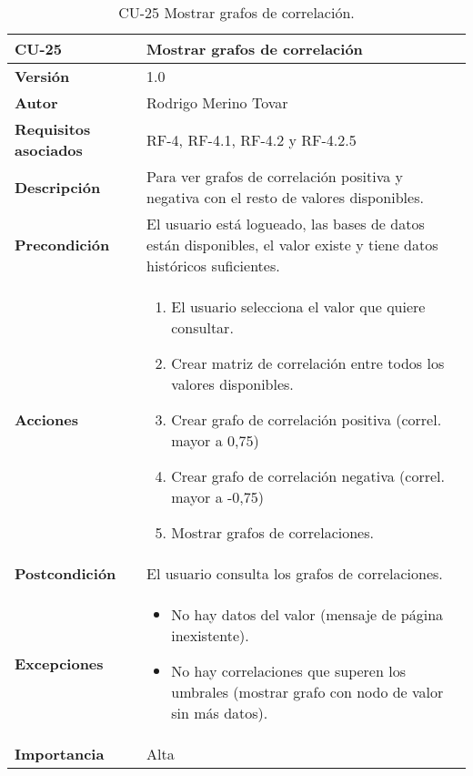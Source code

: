 \begin{table}[p]
	\centering
	\begin{tabularx}{\linewidth}{ p{} p{} }
		\toprule
		\textbf{CU-25}    & \textbf{Mostrar grafos de correlación}\\
		\toprule
		\textbf{Versión}              & 1.0    \\
		\textbf{Autor}                & Rodrigo Merino Tovar \\
		\textbf{Requisitos asociados} & RF-4, RF-4.1, RF-4.2 y RF-4.2.5 \\
		\textbf{Descripción}          & Para ver grafos de correlación positiva y negativa con el resto de valores disponibles.\\
		\textbf{Precondición}         & El usuario está logueado, las bases de datos están disponibles, el valor existe y tiene datos históricos suficientes.  \\
		\textbf{Acciones}             &
		\begin{enumerate}
			\def\labelenumi{\arabic{enumi}.}
			\tightlist 
			\item El usuario selecciona el valor que quiere consultar. 
			\item Crear matriz de correlación entre todos los valores disponibles.
			\item Crear grafo de correlación positiva (correl. mayor a 0,75)
			\item Crear grafo de correlación negativa (correl. mayor a -0,75)
			\item Mostrar grafos de correlaciones.
		\end{enumerate}\\
		\textbf{Postcondición}        & El usuario consulta los grafos de correlaciones. \\
		\textbf{Excepciones}          & 
		\begin{itemize}
			\tightlist
			\item No hay datos del valor (mensaje de página inexistente).
			\item No hay correlaciones que superen los umbrales (mostrar grafo con nodo de valor sin más datos).
		\end{itemize} \\
		\textbf{Importancia}          & Alta \\
		\bottomrule
	\end{tabularx}
	\caption{CU-25 Mostrar grafos de correlación.}
\end{table}


